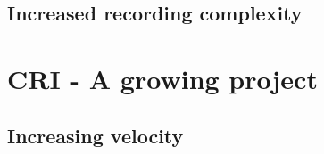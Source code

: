 	\subsection{Increased recording complexity}
	
\section{CRI - A growing project}

	\subsection{Increasing velocity}
		
